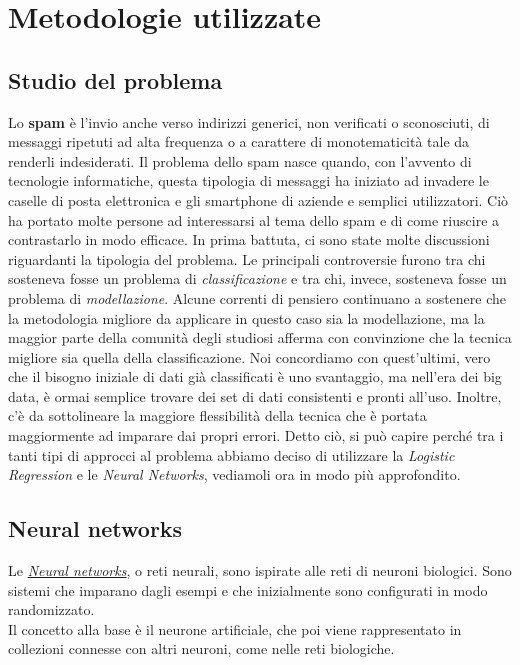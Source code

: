 \section{Metodologie utilizzate}

\subsection{Studio del problema}
Lo \textbf{spam} è l'invio anche verso indirizzi generici, non verificati o sconosciuti, di messaggi ripetuti ad alta frequenza o a carattere di monotematicità tale da renderli indesiderati. Il problema dello spam nasce quando, con l'avvento di tecnologie informatiche, questa tipologia di messaggi ha iniziato ad invadere le caselle di posta elettronica e gli smartphone di aziende e semplici utilizzatori. Ciò ha portato molte persone ad interessarsi al tema dello spam e di come riuscire a contrastarlo in modo efficace.
\newline
In prima battuta, ci sono state molte discussioni riguardanti la tipologia del problema. Le principali controversie furono tra chi sosteneva fosse un problema di \textit{classificazione} e tra chi, invece, sosteneva fosse un problema di \textit{modellazione}.
Alcune correnti di pensiero continuano a sostenere che la metodologia migliore da applicare in questo caso sia la modellazione, ma la maggior parte della comunità degli studiosi afferma con convinzione che la tecnica migliore sia quella della classificazione. Noi concordiamo con quest'ultimi, vero che il bisogno iniziale di dati già classificati è uno svantaggio, ma nell'era dei big data, è ormai semplice trovare dei set di dati consistenti e pronti all'uso. Inoltre, c'è da sottolineare la maggiore flessibilità della tecnica che è portata maggiormente ad imparare dai propri errori.
\newline
Detto ciò, si può capire perché tra i tanti tipi di approcci al problema abbiamo deciso di utilizzare la \textit{Logistic Regression} e le \textit{Neural Networks}, vediamoli ora in modo più approfondito.
\subsection{Neural networks}
Le \href{https://en.wikipedia.org/wiki/Neural_network}{\textit{Neural networks}}, o reti neurali, sono ispirate alle reti di neuroni biologici. Sono sistemi che imparano dagli esempi e che inizialmente sono configurati in modo randomizzato.\\
Il concetto alla base è il neurone artificiale, che poi viene rappresentato in collezioni connesse con altri neuroni, come nelle reti biologiche.


